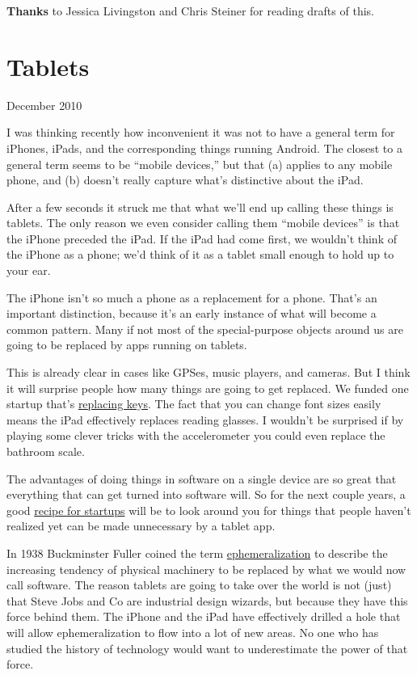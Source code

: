\documentclass[12pt]{book}
\begin{document}
\textbf{Thanks} to Jessica Livingston and Chris Steiner for reading
drafts of this.
\chapter{Tablets}

December 2010

I was thinking recently how inconvenient it was not to have a general
term for iPhones, iPads, and the corresponding things running Android.
The closest to a general term seems to be ``mobile devices,'' but that
(a) applies to any mobile phone, and (b) doesn't really capture what's
distinctive about the iPad.

After a few seconds it struck me that what we'll end up calling these
things is tablets. The only reason we even consider calling them
``mobile devices'' is that the iPhone preceded the iPad. If the iPad had
come first, we wouldn't think of the iPhone as a phone; we'd think of it
as a tablet small enough to hold up to your ear.

The iPhone isn't so much a phone as a replacement for a phone. That's an
important distinction, because it's an early instance of what will
become a common pattern. Many if not most of the special-purpose objects
around us are going to be replaced by apps running on tablets.

This is already clear in cases like GPSes, music players, and cameras.
But I think it will surprise people how many things are going to get
replaced. We funded one startup that's
\href{http://lockitron.com/}{replacing keys}. The fact that you can
change font sizes easily means the iPad effectively replaces reading
glasses. I wouldn't be surprised if by playing some clever tricks with
the accelerometer you could even replace the bathroom scale.

The advantages of doing things in software on a single device are so
great that everything that can get turned into software will. So for the
next couple years, a good \href{http://ycombinator.com/rfs8.html}{recipe
for startups} will be to look around you for things that people haven't
realized yet can be made unnecessary by a tablet app.

In 1938 Buckminster Fuller coined the term
\href{http://en.wikipedia.org/wiki/Ephemeralization}{ephemeralization}
to describe the increasing tendency of physical machinery to be replaced
by what we would now call software. The reason tablets are going to take
over the world is not (just) that Steve Jobs and Co are industrial
design wizards, but because they have this force behind them. The iPhone
and the iPad have effectively drilled a hole that will allow
ephemeralization to flow into a lot of new areas. No one who has studied
the history of technology would want to underestimate the power of that
force.
\end{document}
